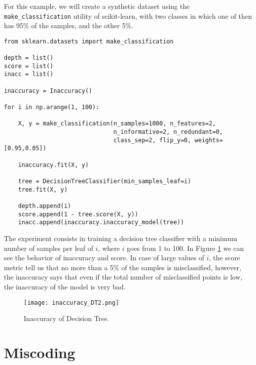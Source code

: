 \begin{example}
\label{ex:machine_learning:inaccuracy:unbalanced_dataset}
For this example, we will create a synthetic dataset using the \texttt{make\_classification} utility of scikit-learn, with two classes in which one of then has 95\% of the samples, and the other 5\%.

\begin{sourcecode}
{\scriptsize \begin{verbatim}
from sklearn.datasets import make_classification

depth = list()
score = list()
inacc = list()

inaccuracy = Inaccuracy()

for i in np.arange(1, 100):
                    
    X, y = make_classification(n_samples=1000, n_features=2,
                               n_informative=2, n_redundant=0,
                               class_sep=2, flip_y=0, weights=[0.95,0.05])

    inaccuracy.fit(X, y)
        
    tree = DecisionTreeClassifier(min_samples_leaf=i)
    tree.fit(X, y)

    depth.append(i)        
    score.append(1 - tree.score(X, y))
    inacc.append(inaccuracy.inaccuracy_model(tree))
\end{verbatim}}
\end{sourcecode}

The experiment consists in training a decision tree classifier with a minimum number of samples per leaf of $i$, where $i$ goes from 1 to 100. In Figure \ref{figure:machine_learning:inaccuracy:inaccuracy_DT2} we can see the behavior of inaccuracy and score. In case of large values of $i$, the score metric tell us that no more than a 5\% of the samples is misclassified, however, the inaccuracy says that even if the total number of misclassified points is low, the inaccuracy of the model is very bad.

\begin{figure}[h]
\centering
\texttt{[image: inaccuracy\_DT2.png]}
\caption{Inaccuracy of Decision Tree.}
\label{figure:machine_learning:inaccuracy:inaccuracy_DT2}
\end{figure}

\end{example}


%
%

\section{Miscoding}
\label{sec:approx-miscoding}

